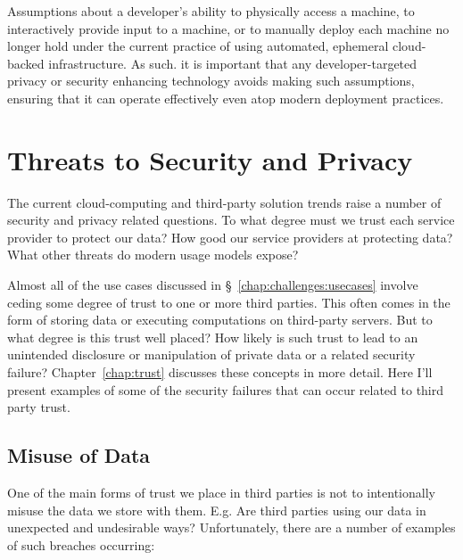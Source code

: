 Assumptions about a developer's ability to physically access a
machine, to interactively provide input to a machine, or to manually
deploy each machine no longer hold under the current practice of using
automated, ephemeral cloud-backed infrastructure. As such. it is
important that any developer-targeted privacy or security enhancing
technology avoids making such assumptions, ensuring that it can
operate effectively even atop modern deployment practices.

\section{Threats to Security and Privacy}
\label{chap:challenges:threats}

The current cloud-computing and third-party solution trends raise a
number of security and privacy related questions. To what degree must
we trust each service provider to protect our data? How good our
service providers at protecting data? What other threats do modern
usage models expose?

Almost all of the use cases discussed in
\S~\ref{chap:challenges:usecases} involve ceding some degree of trust
to one or more third parties. This often comes in the form of storing
data or executing computations on third-party servers. But to what
degree is this trust well placed? How likely is such trust to lead to
an unintended disclosure or manipulation of private data or a related
security failure? Chapter~\ref{chap:trust} discusses these concepts in
more detail. Here I'll present examples of some of the security
failures that can occur related to third party trust.

\subsection{Misuse of Data}

One of the main forms of trust we place in third parties is not to
intentionally misuse the data we store with them. E.g. Are third
parties using our data in unexpected and undesirable ways?
Unfortunately, there are a number of examples of such breaches
occurring:

